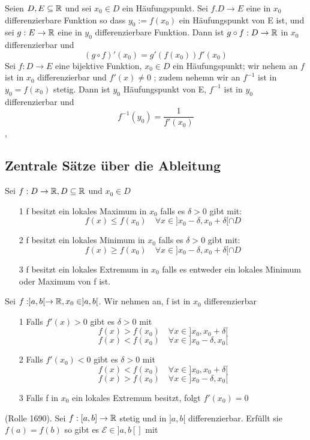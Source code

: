  Seien \(D,E \subseteq \mathbb{R}\) und sei \(x_0 \in D\) ein Häufungspunkt. Sei \(f. D \rightarrow E\) eine in \(x_0\) differenzierbare Funktion so dass \(y_0 := f(x_0)\) ein Häufungspunkt von E ist, und sei \(g : E \rightarrow \mathbb{R} \) eine in \(y_0\) differenzierbare Funktion. Dann ist \(g \circ f : D \rightarrow \mathbb{R} \) in \(x_0\) differenzierbar und
\[ (g \circ f)'(x_0) = g'(f(x_0))f'(x_0)\]
 Sei \(f : D \rightarrow E \) eine bijektive Funktion, \(x_0 \in D\) ein Häufungspunkt; wir nehem an \(f\) ist in \(x_0\) differenzierbar und \(f'(x) \neq 0\) ; zudem nehemn wir an \(f^{-1}\) ist in \(y_0 = f(x_0)\) stetig. Dann ist \(y_0\) Häufungspunkt von E, \(f^{-1}\) ist in \(y_0\) differenzierbar und
\[f^{-1}(y_0) = \frac{1}{f'(x_0)}\]
\sep
\subsection{Zentrale Sätze über die Ableitung}
 Sei \(f: D \rightarrow \mathbb{R}, D \subseteq \mathbb{R} \) und \(x_0 \in D\)
\begin{enumerate}
    \item [1] f besitzt ein lokales Maximum in \(x_0\) falls es \( \delta > 0 \) gibt mit:
    \[f(x) \leq f(x_0) \quad \forall x \in ]x_0 - \delta, x_0 + \delta [ \cap D\]
    \item [2] f besitzt ein lokales Minimum in \(x_0\) falls es \( \delta > 0 \) gibt mit:
    \[f(x) \geq f(x_0) \quad \forall x \in ]x_0 - \delta, x_0 + \delta[ \cap D\]
    \item [3] f besitzt ein lokales Extremum in \(x_0\) falls es entweder ein lokales Minimum oder Maximum von f ist.
\end{enumerate}
 Sei \(f: ]a,b[ \rightarrow \mathbb{R}, x_0 \in ]a,b[\). Wir nehmen an, f ist in \(x_0\) differenzierbar
\begin{enumerate}
    \item [1] Falls \(f'(x) > 0\) gibt es \( \delta > 0\) mit
    \[f(x) > f(x_0) \quad \forall x \in ]x_0,x_0 + \delta [\]
    \[f(x) < f(x_0) \quad \forall x \in ]x_0 - \delta ,x_0[\]
    \item [2] Falls \(f'(x_0) < 0 \) gibt es \( \delta > 0\) mit
    \[f(x) < f(x_0) \quad \forall x \in ]x_0,x_0 + \delta [\]
    \[f(x) > f(x_0) \quad \forall x \in ]x_0 - \delta ,x_0[\]
    \item [3] Falls f in \(x_0\) ein lokales Extremum besitzt, folgt \(f'(x_0) = 0\)
\end{enumerate}
 (Rolle 1690). Sei \(f: [a,b] \rightarrow \mathbb{R} \) stetig und in \(]a,b[\) differenzierbar. Erfüllt sie \(f(a) = f(b)\) so gibt es \(\mathcal{E} \in ]a,b[]\) mit 
